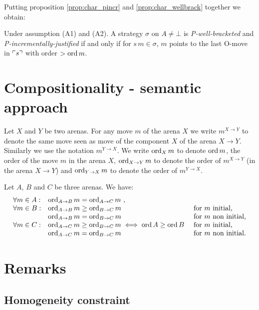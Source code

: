 Putting proposition \ref{prop:char_pincr} and
\ref{prop:char_wellbrack} together we obtain:
\begin{proposition}
Under assumption (A1) and (A2).
A strategy $\sigma$ on $A\neq \bot$
is \emph{P-well-bracketed} and
 \emph{P-incrementally-justified} if and only if
for $s \, m \in \sigma$, $m$ points to the last O-move in $\ulcorner s \urcorner$ with order $>\mathop{\mathrm{ord}}{m}$.
\end{proposition}

\section{Compositionality - semantic approach}
 

Let $X$ and $Y$ be two arenas.
For any move $m$ of the arena $X$ we write $m^{X\rightarrow Y}$ to denote the same move seen as move of the component $X$ of the arena $X\rightarrow Y$.
Similarly we use the notation $m^{Y\rightarrow X}$.
We write $\mathop{\mathrm{ord}}_X{m}$ to denote $\mathop{\mathrm{ord}}{m}$, the order of the move $m$ in the arena $X$, $\mathop{\mathrm{ord}}_{X\rightarrow Y}{m}$ to denote the order of $m^{X\rightarrow Y}$ (in the arena $X\rightarrow Y$) and $\mathop{\mathrm{ord}}_{Y\rightarrow X}{m}$ to denote the order of $m^{Y\rightarrow X}$.

\begin{lemma}
\label{lem:compositionorder}
Let $A$, $B$ and $C$ be three arenas. We have:
$$\begin{array}{lll}
\forall m \in A:
    &  \mathop{\mathrm{ord}}_{A\rightarrow B}{m} = \mathop{\mathrm{ord}}_{A\rightarrow C}{m} \ ,\\
\forall m \in B:
    & \mathop{\mathrm{ord}}_{A\rightarrow B}{m} \geq \mathop{\mathrm{ord}}_{B\rightarrow C}{m}  & \mbox{for $m$ initial,}\\
    & \mathop{\mathrm{ord}}_{A\rightarrow B}{m} = \mathop{\mathrm{ord}}_{B\rightarrow C}{m} & \mbox{for $m$ non initial,} \\
\forall m \in C:
    & \mathop{\mathrm{ord}}_{A\rightarrow C}{m} \geq \mathop{\mathrm{ord}}_{B\rightarrow C}{m} \iff
\mathop{\mathrm{ord}}{A} \geq \mathop{\mathrm{ord}}{B}\ & \mbox{for $m$ initial,}\\
    & \mathop{\mathrm{ord}}_{A\rightarrow C}{m} = \mathop{\mathrm{ord}}_{B\rightarrow C}{m}   & \mbox{for $m$ non initial.}
\end{array}
$$
\end{lemma}




\section{Remarks}
\subsection{Homogeneity constraint}

